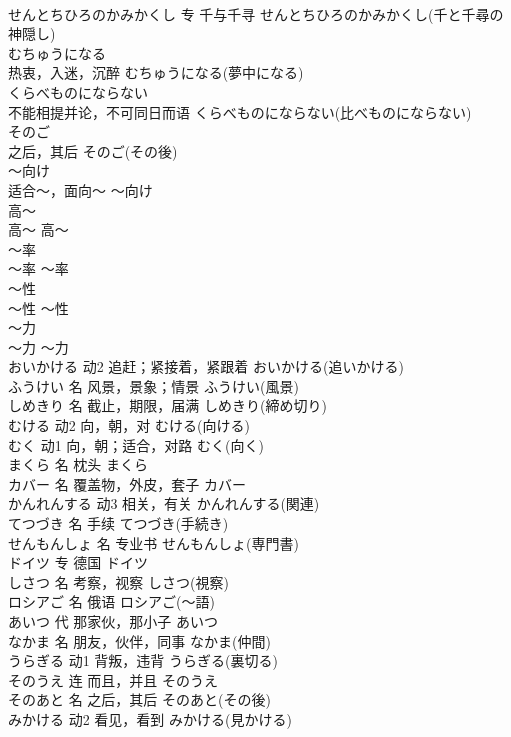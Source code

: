 \documentclass[8pt]{extreport}
\begin{document}
\begin{CJK}{UTF8}{min}
\\	せんとちひろのかみかくし	专	千与千寻	せんとちひろのかみかくし(千と千尋の神隠し)	
\\	むちゅうになる	
\\	热衷，入迷，沉醉	むちゅうになる(夢中になる)	
\\	くらべものにならない	
\\	不能相提并论，不可同日而语	くらべものにならない(比べものにならない)	
\\	そのご	
\\	之后，其后	そのご(その後)	
\\	～向け	
\\	适合～，面向～	～向け	
\\	高～	
\\	高～	高～	
\\	～率	
\\	～率	～率	
\\	～性	
\\	～性	～性	
\\	～力	
\\	～力	～力	
\\	おいかける	动2	追赶；紧接着，紧跟着	おいかける(追いかける)	
\\	ふうけい	名	风景，景象；情景	ふうけい(風景)	
\\	しめきり	名	截止，期限，届满	しめきり(締め切り)	
\\	むける	动2	向，朝，对	むける(向ける)	
\\	むく	动1	向，朝；适合，对路	むく(向く)	
\\	まくら	名	枕头	まくら	
\\	カバー	名	覆盖物，外皮，套子	カバー	
\\	かんれんする	动3	相关，有关	かんれんする(関連)	
\\	てつづき	名	手续	てつづき(手続き)	
\\	せんもんしょ	名	专业书	せんもんしょ(専門書)	
\\	ドイツ	专	德国	ドイツ	
\\	しさつ	名	考察，视察	しさつ(視察)	
\\	ロシアご	名	俄语	ロシアご(～語)	
\\	あいつ	代	那家伙，那小子	あいつ	
\\	なかま	名	朋友，伙伴，同事	なかま(仲間)	
\\	うらぎる	动1	背叛，违背	うらぎる(裏切る)	
\\	そのうえ	连	而且，并且	そのうえ	
\\	そのあと	名	之后，其后	そのあと(その後)	
\\	みかける	动2	看见，看到	みかける(見かける)	

\end{CJK}
\end{document}
